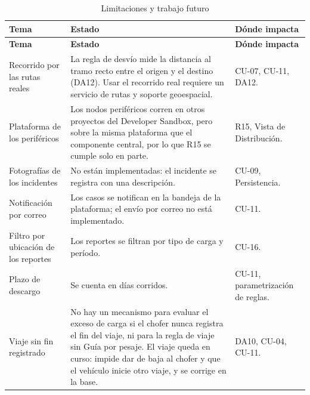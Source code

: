 \begin{longtable}{|p{4.6cm}|p{7.4cm}|p{3.5cm}|}
    \caption{Limitaciones y trabajo futuro}\label{tab:decisiones-pendientes}\\
    \hline
    \textbf{Tema} & \textbf{Estado} & \textbf{Dónde impacta} \\
    \hline
    \endfirsthead
    \hline
    \textbf{Tema} & \textbf{Estado} & \textbf{Dónde impacta} \\
    \hline
    \endhead
    Recorrido por las rutas reales & La regla de desvío mide la distancia al tramo recto entre el origen y el destino (DA12). Usar el recorrido real requiere un servicio de rutas y soporte geoespacial. & CU-07, CU-11, DA12. \\
    \hline
    Plataforma de los periféricos & Los nodos periféricos corren en otros proyectos del Developer Sandbox, pero sobre la misma plataforma que el componente central, por lo que R15 se cumple solo en parte. & R15, Vista de Distribución. \\
    \hline
    Fotografías de los incidentes & No están implementadas: el incidente se registra con una descripción. & CU-09, Persistencia. \\
    \hline
    Notificación por correo & Los casos se notifican en la bandeja de la plataforma; el envío por correo no está implementado. & CU-11. \\
    \hline
    Filtro por ubicación de los reportes & Los reportes se filtran por tipo de carga y período. & CU-16. \\
    \hline
    Plazo de descargo & Se cuenta en días corridos. & CU-11, parametrización de reglas. \\
    \hline
    Viaje sin fin registrado & No hay un mecanismo para evaluar el exceso de carga si el chofer nunca registra el fin del viaje, ni para la regla de viaje sin Guía por pesaje. El viaje queda en curso: impide dar de baja al chofer y que el vehículo inicie otro viaje, y se corrige en la base. & DA10, CU-04, CU-11. \\
    \hline
\end{longtable}
